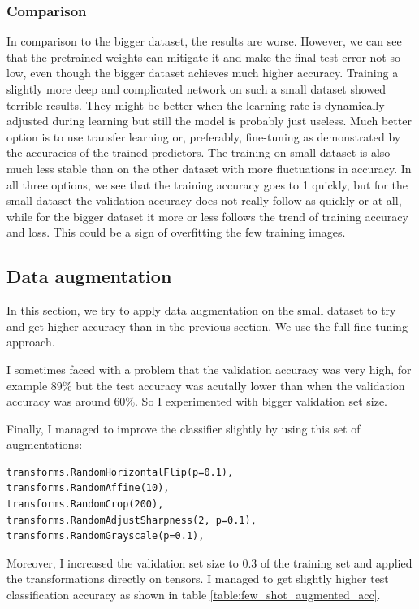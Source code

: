 \documentclass[a4paper,11pt]{article}
\begin{document}
\subsubsection{Comparison}
In comparison to the bigger dataset, the results are worse.
However, we can see that the pretrained weights can mitigate it and make the final test error not so low, even though the bigger dataset achieves much higher accuracy.
Training a slightly more deep and complicated network on such a small dataset showed terrible results.
They might be better when the learning rate is dynamically adjusted during learning but still the model is probably just useless.
Much better option is to use transfer learning or, preferably, fine-tuning as demonstrated by the accuracies of the trained predictors.
The training on small dataset is also much less stable than on the other dataset with more fluctuations in accuracy.
In all three options, we see that the training accuracy goes to 1 quickly, but for the small dataset the validation accuracy does not really follow as quickly or at all, while for the bigger dataset it more or less follows the trend of training accuracy and loss.
This could be a sign of overfitting the few training images.

\subsection{Data augmentation}
In this section, we try to apply data augmentation on the small dataset to try and get higher accuracy than in the previous section.
We use the full fine tuning approach.

I sometimes faced with a problem that the validation accuracy was very high, for example $89\%$ but the test accuracy was acutally lower than when the validation accuracy was around $60\%$.
So I experimented with bigger validation set size.

Finally, I managed to improve the classifier slightly by using this set of augmentations:
\begin{verbatim}
transforms.RandomHorizontalFlip(p=0.1),
transforms.RandomAffine(10),
transforms.RandomCrop(200),
transforms.RandomAdjustSharpness(2, p=0.1),
transforms.RandomGrayscale(p=0.1),
\end{verbatim}

Moreover, I increased the validation set size to $0.3$ of the training set and applied the transformations directly on tensors.
I managed to get slightly higher test classification accuracy as shown in table \ref{table:few_shot_augmented_acc}.
\end{document}
